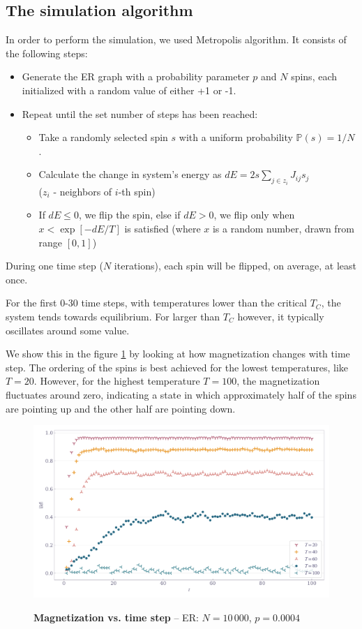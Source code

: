 \documentclass[11pt,a4paper]{article}
\begin{document}
\subsection{The simulation algorithm}

In order to perform the simulation, we used Metropolis algorithm. It consists of the following steps:
\begin{itemize}
\item Generate the ER graph with a probability parameter $p$ and $N$ spins, each initialized with a random value of either +1 or -1.
\item Repeat until the set number of steps has been reached:
    \begin{itemize}
    \item Take a randomly selected spin $s$ with a uniform probability $\mathbb{P}(s)=1/N$.
    \item Calculate the change in system's energy as $dE = 2 s \sum_{j\in z_i} J_{ij} s_j$\\ ($z_i$ - neighbors of $i$-th spin)
    \item If $dE\leq0$, we flip the spin, else if $dE>0$, we flip only when $x < \exp[-dE/T]$ is satisfied (where $x$ is a random number, drawn from range $[0,1]$)
    \end{itemize}
\end{itemize}

During one time step ($N$ iterations), each spin will be flipped, on average, at least once.

For the first 0-30 time steps, with temperatures lower than the critical $T_C$, the system tends towards equilibrium. For larger than $T_C$ however, it typically oscillates around some value.

We show this in the figure \ref{fig:mag_vs_time} by looking at how magnetization changes with time step. The ordering of the spins is best achieved for the lowest temperatures, like $T=20$. However, for the highest temperature $T=100$, the magnetization fluctuates around zero, indicating a state in which approximately half of the spins are pointing up and the other half are pointing down.

\begin{figure}[ht!]
    \centering
    \caption{\textbf{Magnetization vs. time step} -- ER: $N=10\,000$, $p=0.0004$}
    \includegraphics[width=\linewidth]{../figures/magnet_vs_steps.pdf}
    \label{fig:mag_vs_time}
\end{figure}
\end{document}

